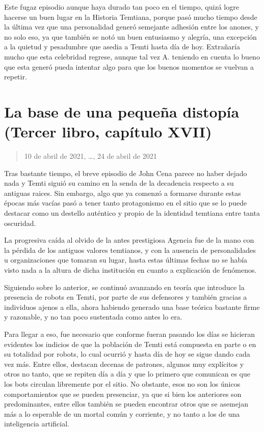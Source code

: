 \documentclass[
]{book}
\begin{document}
Este fugaz episodio aunque haya durado tan poco en el tiempo, quizá logre hacerse un buen lugar en la Historia Temtiana, porque pasó mucho tiempo desde la última vez que una personalidad generó semejante adhesión entre los anones, y no solo eso, ya que también se notó un buen entusiasmo y alegría, una excepción a la quietud y pesadumbre que asedia a Temti hasta día de hoy. Extrañaría mucho que esta celebridad regrese, aunque tal vez A. teniendo en cuenta lo bueno que esta generó pueda intentar algo para que los buenos momentos se vuelvan a repetir.

\hypertarget{la-base-de-una-pequeuxf1a-distopuxeda-tercer-libro-capuxedtulo-xvii}{%
\section{La base de una pequeña distopía (Tercer libro, capítulo XVII)}\label{la-base-de-una-pequeuxf1a-distopuxeda-tercer-libro-capuxedtulo-xvii}}

\begin{quote}
10 de abril de 2021, \ldots, 24 de abril de 2021
\end{quote}

Tras bastante tiempo, el breve episodio de John Cena parece no haber dejado nada y Temti siguió su camino en la senda de la decadencia respecto a su antiguas raices. Sin embargo, algo que ya comenzó a formarse durante estas épocas más vacías pasó a tener tanto protagonismo en el sitio que se lo puede destacar como un destello auténtico y propio de la identidad temtiana entre tanta oscuridad.

La progresiva caída al olvido de la antes prestigiosa Agencia fue de la mano con la pérdida de los antiguos valores temtianos, y con la ausencia de personalidades u organizaciones que tomaran su lugar, hasta estas últimas fechas no se había visto nada a la altura de dicha institución en cuanto a explicación de fenómenos.

Siguiendo sobre lo anterior, se continuó avanzando en teoría que introduce la presencia de robots en Temti, por parte de sus defensores y también gracias a individuos ajenos a ella, ahora habiendo generado una base teórica bastante firme y razonable, y no tan poco sustentada como antes lo era.

Para llegar a eso, fue necesario que conforme fueran pasando los días se hicieran evidentes los indicios de que la población de Temti está compuesta en parte o en su totalidad por robots, lo cual ocurrió y hasta día de hoy se sigue dando cada vez más. Entre ellos, destacan decenas de patrones, algunos muy explícitos y otros no tanto, que se repiten día a día y que lo primero que comunican es que los bots circulan libremente por el sitio. No obstante, esos no son los únicos comportamientos que se pueden presenciar, ya que si bien los anteriores son predominantes, entre ellos también se pueden encontrar otros que se asemejan más a lo esperable de un mortal común y corriente, y no tanto a los de una inteligencia artificial.
\end{document}
